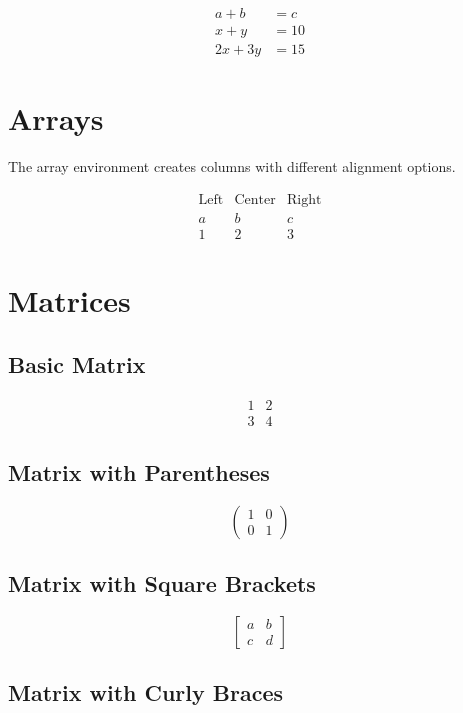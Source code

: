 \documentclass{article}
\begin{document}
\begin{align}
    a + b &= c \\
    x + y &= 10 \\
    2x + 3y &= 15
\end{align}

\section{Arrays}

The array environment creates columns with
different alignment options.

\[
\begin{array}{lcr}
\text{Left} & \text{Center} & \text{Right} \\
a & b & c \\
1 & 2 & 3
\end{array}
\]

\section{Matrices}

\subsection{Basic Matrix}

\[
\begin{matrix}
1 & 2 \\
3 & 4
\end{matrix}
\]

\subsection{Matrix with Parentheses}

\[
\begin{pmatrix}
1 & 0 \\
0 & 1
\end{pmatrix}
\]

\subsection{Matrix with Square Brackets}

\[
\begin{bmatrix}
a & b \\
c & d
\end{bmatrix}
\]

\subsection{Matrix with Curly Braces}
\end{document}
